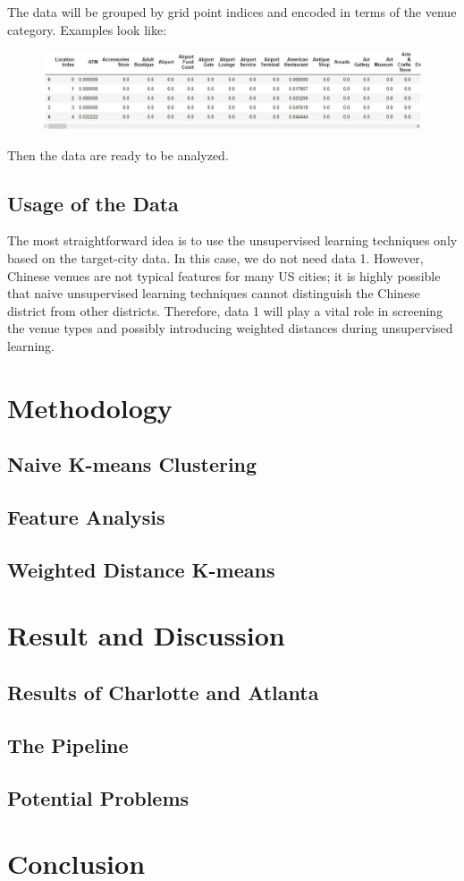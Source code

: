 \documentclass{article}
\begin{document}
\newpage

The data will be grouped by grid point indices and encoded in terms of the venue category. Examples look like:
\begin{figure}[h!]
\includegraphics[width=1.0\textwidth]{c6.jpg}
\centering
\end{figure}

Then the data are ready to be analyzed.

\subsection{Usage of the Data}

The most straightforward idea is to use the unsupervised learning techniques only based on the target-city data.
In this case, we do not need data 1.
However, Chinese venues are not typical features for many US cities; it is highly possible that naive unsupervised learning techniques cannot distinguish the Chinese district from other districts.
Therefore, data 1 will play a vital role in screening the venue types and possibly introducing weighted distances during unsupervised learning.

\section{Methodology}
\subsection{Naive K-means Clustering}

\subsection{Feature Analysis}

\subsection{Weighted Distance K-means}

\section{Result and Discussion}

\subsection{Results of Charlotte and Atlanta}

\subsection{The Pipeline}

\subsection{Potential Problems}

\section{Conclusion}

\newpage



\end{document}
